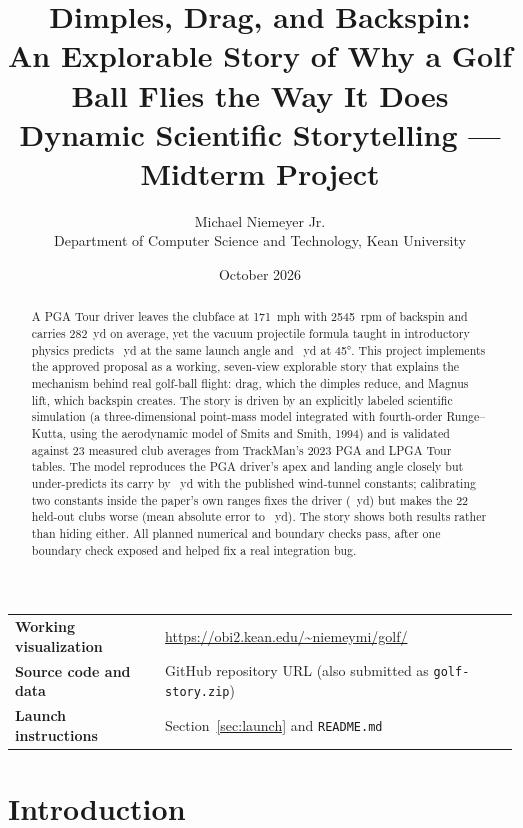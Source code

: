 \documentclass[11pt]{article}
\title{\textbf{Dimples, Drag, and Backspin:}\\
       \large An Explorable Story of Why a Golf Ball Flies the Way It Does\\[4pt]
       \normalsize Dynamic Scientific Storytelling --- Midterm Project}
\author{Michael Niemeyer Jr.\\
        Department of Computer Science and Technology, Kean University}
\date{October 2026}
\newcommand{\todo}[1]{\textcolor{orange!85!black}{#1}}
\begin{document}
\maketitle

\begin{center}
\small
\begin{tabular}{@{}ll@{}}
\textbf{Working visualization} & \todo{\url{https://obi2.kean.edu/~niemeymi/golf/}} \\
\textbf{Source code and data}  & \todo{GitHub repository URL} (also submitted as \texttt{golf-story.zip}) \\
\textbf{Launch instructions}   & Section~\ref{sec:launch} and \texttt{README.md} \\
\end{tabular}
\end{center}

\begin{abstract}
\noindent
A PGA Tour driver leaves the clubface at \SI{171}{mph} with \SI{2545}{rpm} of backspin and carries
\SI{282}{yd} on average, yet the vacuum projectile formula taught in introductory physics predicts
\VacDrv{}~yd at the same launch angle and \VacDrvFortyFive{}~yd at \ang{45}. This project implements
the approved proposal as a working, seven-view explorable story that explains the mechanism behind
real golf-ball flight: drag, which the dimples reduce, and Magnus lift, which backspin creates.
The story is driven by an explicitly labeled scientific simulation (a three-dimensional point-mass
model integrated with fourth-order Runge--Kutta, using the aerodynamic model of Smits and Smith,
1994) and is validated against 23 measured club averages from TrackMan's 2023 PGA and LPGA Tour
tables. The model reproduces the PGA driver's apex and landing angle closely but under-predicts its
carry by \RawDrvErr{}~yd with the published wind-tunnel constants; calibrating two constants inside
the paper's own ranges fixes the driver (\CalErrYd{}~yd) but makes the 22 held-out clubs worse (mean
absolute error \HeldRaw{} to \HeldCal{}~yd). The story shows both results rather than hiding either.
All \NChecks{} planned numerical and boundary checks pass, after one boundary check exposed and
helped fix a real integration bug.
\end{abstract}

\section{Introduction}
\end{document}

